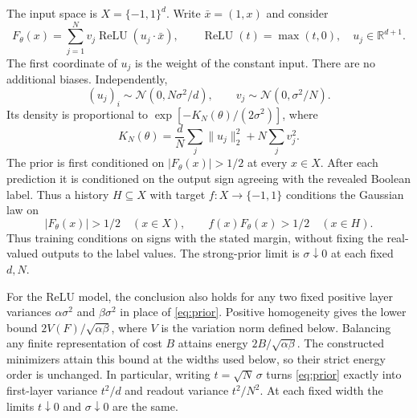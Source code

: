 \documentclass[11pt]{article}
\theoremstyle{remark}\newtheorem{remark}[theorem]{Remark}
\newcommand{\R}{\mathbb R}\newcommand{\E}{\mathbb E}\newcommand{\Prb}{\mathbb P}
\newcommand{\relu}{\operatorname{ReLU}}\newcommand{\Var}{\operatorname{Var}}
\begin{document}
The input space is $X=\{-1,1\}^d$. Write $\bar x=(1,x)$ and consider
\begin{equation}\label{eq:network}
 F_\theta(x)=\sum_{j=1}^N v_j\relu(u_j\cdot\bar x),
 \qquad \relu(t)=\max(t,0),\quad u_j\in\R^{d+1}.
\end{equation}
The first coordinate of $u_j$ is the weight of the constant input. There
are no additional biases. Independently,
\begin{equation}\label{eq:prior}
 (u_j)_i\sim\mathcal N(0,N\sigma^2/d),\qquad
 v_j\sim\mathcal N(0,\sigma^2/N).
\end{equation}
Its density is proportional to $\exp[-K_N(\theta)/(2\sigma^2)]$, where
\begin{equation}\label{eq:energy}
 K_N(\theta)=\frac dN\sum_j\|u_j\|_2^2+N\sum_jv_j^2.
\end{equation}
The prior is first conditioned on $|F_\theta(x)|>1/2$ at every $x\in X$.
After each prediction it is conditioned on the output sign agreeing with
the revealed Boolean label.
Thus a history $H\subseteq X$ with target $f:X\to\{-1,1\}$ conditions
the Gaussian law on
\begin{equation}\label{eq:posterior-cell}
 |F_\theta(x)|>1/2\quad(x\in X),\qquad
 f(x)F_\theta(x)>1/2\quad(x\in H).
\end{equation}
Thus training conditions on signs with the stated margin, without fixing
the real-valued outputs to the label values.
The strong-prior limit is $\sigma\downarrow0$ at each fixed $d,N$.

For the ReLU model, the conclusion also holds for any two fixed positive layer variances
$\alpha\sigma^2$ and $\beta\sigma^2$ in place of \eqref{eq:prior}.
Positive homogeneity gives the lower bound
$2V(F)/\sqrt{\alpha\beta}$, where $V$ is the variation norm defined below.
Balancing any finite representation of cost $B$ attains energy
$2B/\sqrt{\alpha\beta}$. The constructed minimizers attain this bound
at the widths used below, so their strict energy order is unchanged.
In particular, writing $t=\sqrt N\,\sigma$ turns \eqref{eq:prior} exactly into first-layer variance $t^2/d$ and readout variance $t^2/N^2$. At each fixed width the limits $t\downarrow0$ and $\sigma\downarrow0$ are the same.
\end{document}
